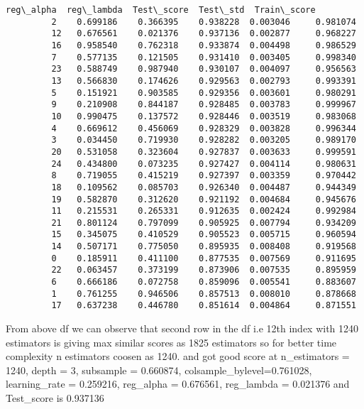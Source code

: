 \documentclass[11pt]{article}
\begin{document}
\begin{Verbatim}[commandchars=\\\{\}]
             reg\_alpha  reg\_lambda  Test\_score  Test\_std  Train\_score  
         2    0.699186    0.366395    0.938228  0.003046     0.981074  
         12   0.676561    0.021376    0.937136  0.002877     0.968227  
         16   0.958540    0.762318    0.933874  0.004498     0.986529  
         7    0.577135    0.121505    0.931410  0.003405     0.998340  
         23   0.588749    0.987940    0.930107  0.004097     0.956563  
         13   0.566830    0.174626    0.929563  0.002793     0.993391  
         5    0.151921    0.903585    0.929356  0.003601     0.980291  
         9    0.210908    0.844187    0.928485  0.003783     0.999967  
         10   0.990475    0.137572    0.928446  0.003519     0.983068  
         4    0.669612    0.456069    0.928329  0.003828     0.996344  
         3    0.034450    0.719930    0.928282  0.003205     0.989170  
         20   0.531058    0.323604    0.927837  0.003633     0.999591  
         24   0.434800    0.073235    0.927427  0.004114     0.980631  
         8    0.719055    0.415219    0.927397  0.003359     0.970442  
         18   0.109562    0.085703    0.926340  0.004487     0.944349  
         19   0.582870    0.312620    0.921192  0.004684     0.945676  
         11   0.215531    0.265331    0.912635  0.002424     0.992984  
         21   0.801124    0.797099    0.905925  0.007794     0.934209  
         15   0.345075    0.410529    0.905523  0.005715     0.960594  
         14   0.507171    0.775050    0.895935  0.008408     0.919568  
         0    0.185911    0.411100    0.877535  0.007569     0.911695  
         22   0.063457    0.373199    0.873906  0.007535     0.895959  
         6    0.666186    0.072758    0.859096  0.005541     0.883607  
         1    0.761255    0.946506    0.857513  0.008010     0.878668  
         17   0.637238    0.446780    0.851614  0.004864     0.871551  
\end{Verbatim}
            
    From above df we can observe that second row in the df i.e 12th index
with 1240 estimators is giving max similar scores as 1825 estimators so
for better time complexity n estimators coosen as 1240. and got good
score at n\_estimators = 1240, depth = 3, subsample = 0.660874,
colsample\_bylevel=0.761028, learning\_rate = 0.259216, reg\_alpha =
0.676561, reg\_lambda = 0.021376 and Test\_score is 0.937136
\end{document}
